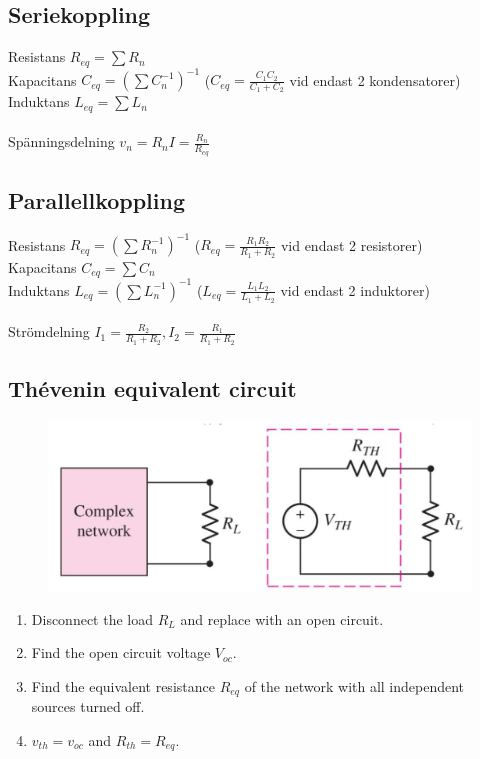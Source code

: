 \subsection{Seriekoppling}

Resistans $ R_{eq} = \sum R_n $
\\
Kapacitans  $ C_ {eq} = (\sum C_n ^{-1})^{-1} $ \tab (\( C_{eq} = \frac{C_1C_2}{C_1+C_2} \) vid endast 2 kondensatorer)
\\
Induktans $ L_{eq} = \sum L_n $
\\ \\
Spänningsdelning \tab $ v_{n} = R_nI = \frac{R_n}{R_{eq}} $

\subsection{Parallellkoppling}

Resistans $ R_{eq} = (\sum R_n^{-1})^{-1} $ \tab ($ R_{eq} = \frac{R_1R_2}{R_1 + R_2} $ vid endast 2 resistorer)
\\
Kapacitans $ C_{eq} = \sum C_n $
\\
Induktans $ L_{eq} = (\sum L_n^{-1})^{-1} $ \tab (\(L_{eq} = \frac{L_1L_2}{L_1+L_2}\) vid endast 2 induktorer)
\\ \\
Strömdelning \tab $ I_1 = \frac{R_2}{R_1+R_2}, I_2 = \frac{R_1}{R_1+R_2} $

\subsection{Thévenin equivalent circuit}

\begin{figure}[H]
    \centering
        \includegraphics[scale=0.5]{thevenin.png}
    \label{fig:thevenin}
\end{figure}

\begin{enumerate}
    \item Disconnect the load \(R_L\) and replace with an open circuit.
    \item Find the open circuit voltage \(V_{oc}\).
    \item Find the equivalent resistance \(R_{eq}\) of the network with all independent sources turned off.
    \item \(v_{th} = v_{oc}\) and \(R_{th} = R_{eq}\).
\end{enumerate}

